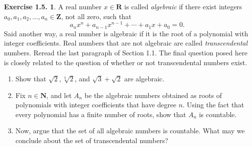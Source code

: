 \documentclass[12pt]{article}
\theoremstyle{definition}
\theoremstyle{exercise}
\newtheorem{exercise}{Exercise 1.5.}
\theoremstyle{solution}
\newcommand{\N}{\mathbf{N}}
\newcommand{\Z}{\mathbf{Z}}
\newcommand{\R}{\mathbf{R}}
\begin{document}
\begin{exercise}
\label{ex:9}
    A real number \( x \in \R \) is called \textit{algebraic} if there exist integers \( a_0, a_1, a_2, \ldots, a_n \in \Z \), not all zero, such that
    \[
        a_n x^n + a_{n-1} x^{n-1} + \cdots + a_1 x + a_0 = 0.
    \]
    Said another way, a real number is algebraic if it is the root of a polynomial with integer coefficients. Real numbers that are not algebraic are called \textit{transcendental} numbers. Reread the last paragraph of Section 1.1. The final question posed here is closely related to the question of whether or not transcendental numbers exist.
    \begin{enumerate}
        \item Show that \( \sqrt{2}, \sqrt[3]{2} \), and \( \sqrt{3} + \sqrt{2} \) are algebraic.

        \item Fix \( n \in \N \), and let \( A_n \) be the algebraic numbers obtained as roots of polynomials with integer coefficients that have degree \( n \). Using the fact that every polynomial has a finite number of roots, show that \( A_n \) is countable.

        \item Now, argue that the set of all algebraic numbers is countable. What may we conclude about the set of transcendental numbers?
    \end{enumerate}
\end{exercise}
\end{document}
